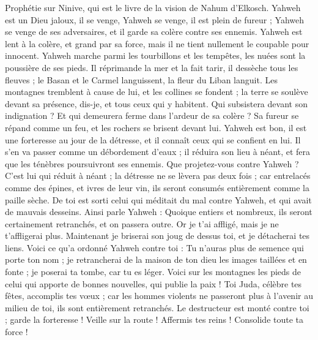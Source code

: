 \begin{multicols}{2}
\VerseOne{}Prophétie sur Ninive, qui est le livre de la vision de Nahum d'Elkosch.
Yahweh est un Dieu jaloux, il se venge, Yahweh se venge, il est plein de fureur ; Yahweh se venge de ses adversaires, et il garde sa colère contre ses ennemis.
Yahweh est lent à la colère, et grand par sa force, mais il ne tient nullement le coupable pour innocent. Yahweh marche parmi les tourbillons et les tempêtes, les nuées sont la poussière de ses pieds.
Il réprimande la mer et la fait tarir, il dessèche tous les fleuves ; le Basan et le Carmel languissent, la fleur du Liban languit.
Les montagnes tremblent à cause de lui, et les collines se fondent ; la terre se soulève devant sa présence, dis-je, et tous ceux qui y habitent.
Qui subsistera devant son indignation ? Et qui demeurera ferme dans l'ardeur de sa colère ? Sa fureur se répand comme un feu, et les rochers se brisent devant lui.
Yahweh est bon, il est une forteresse au jour de la détresse, et il connaît ceux qui se confient en lui.
Il s'en va passer comme un débordement d'eaux ; il réduira son lieu à néant, et fera que les ténèbres poursuivront ses ennemis.
Que projetez-vous contre Yahweh ? C'est lui qui réduit à néant ; la détresse ne se lèvera pas deux fois ;
car entrelacés comme des épines, et ivres de leur vin, ils seront consumés entièrement comme la paille sèche.
De toi est sorti celui qui méditait du mal contre Yahweh, et qui avait de mauvais desseins.
Ainsi parle Yahweh : Quoique entiers et nombreux, ils seront certainement retranchés, et on passera outre. Or je t'ai affligé, mais je ne t'affligerai plus.
Maintenant je briserai son joug de dessus toi, et je détacherai tes liens.
Voici ce qu'a ordonné Yahweh contre toi : Tu n'auras plus de semence qui porte ton nom ; je retrancherai de la maison de ton dieu les images taillées et en fonte ; je poserai ta tombe, car tu es léger.
\VerseOne{}Voici sur les montagnes les pieds de celui qui apporte de bonnes nouvelles, qui publie la paix ! Toi Juda, célèbre tes fêtes, accomplis tes vœux ; car les hommes violents ne passeront plus à l'avenir au milieu de toi, ils sont entièrement retranchés.
Le destructeur est monté contre toi ; garde la forteresse ! Veille sur la route ! Affermis tes reins ! Consolide toute ta force !

\end{multicols}
